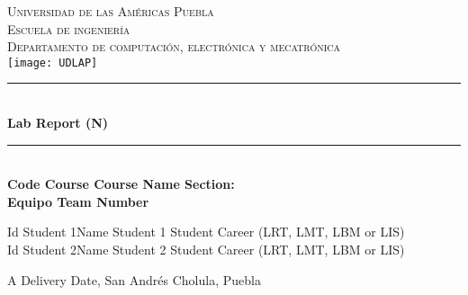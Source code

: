 \documentclass[12pt]{article}  %
\def\titulo{Lab Report (N)}%
\def\materia{Code Course Course Name Section: } %
\def\fecha{Delivery Date} %
\def\equipo {Team Number}%
\def\ida{Id Student 1} %
\def\esta{Name Student 1}
\def\cara{Student Career (LRT, LMT, LBM or LIS)}
\def\idb{Id Student 2}
\def\estb{Name Student 2}
\def\carb{Student Career (LRT, LMT, LBM or LIS)}
\begin{document}
\begin{center}														
\newcommand{\HRule}{\rule{\linewidth}{0.5mm}}						
\thispagestyle{empty} 												
\vspace*{-1.5cm}								
\textsc{\huge Universidad de las Américas Puebla}\\[1.5cm]	
\textsc{\LARGE Escuela de ingeniería}\\[1.5cm]	
\textsc{\LARGE Departamento de computación, electrónica y mecatrónica}\\[1.5cm]												
\texttt{[image: UDLAP]}  									\vspace*{1cm}														\HRule \\[0.4cm]												
{ \huge \bfseries \titulo}\\[0.4cm]	
\HRule \\[1cm]														
{ \Large \bfseries \materia}\\[1cm] 	
{ \Large \bfseries Equipo \equipo}\\[1cm] 							
\begin{flushleft} \Large											
\ida \hspace{0.5cm}\esta \hspace{0.5cm} \cara \\
\idb \hspace{0.5cm}\estb \hspace{0.5cm} \carb \\
\end{flushleft}														
\vfill																
\begin{center}													
{\Large A \fecha, San Andrés Cholula, Puebla}						
\end{center}												 		
\end{center}							 								\newpage						
\thispagestyle{empty} %
\tableofcontents %
\newpage %
\setcounter{page}{1} %
\end{document}
